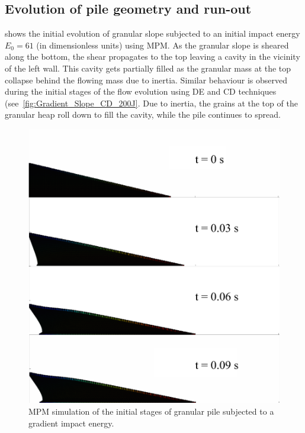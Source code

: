 \subsection{Evolution of pile geometry and run-out}
\label{sec:evolution}

 shows the initial evolution of granular 
slope subjected to an initial impact energy $E_0 = 61$ (in dimensionless units) 
using MPM. As the granular slope is sheared along the bottom, the shear 
propagates to the top leaving a cavity in the vicinity of the left wall. This 
cavity gets partially filled as the granular mass at the top collapse behind 
the flowing mass due to inertia. Similar behaviour is observed during the 
initial stages of the flow evolution using DE and CD techniques
(see~\cref{fig:Gradient_Slope_CD_200J}. Due to inertia, the grains at the top 
of the granular heap roll down to fill the cavity, while the pile continues to 
spread. 

\begin{figure}[tbph]
\centering
\includegraphics[width=\textwidth]{Gradient_Slope_Profile_200J}
\caption{MPM simulation of the initial stages of granular pile subjected to a 
gradient impact 
energy.}
\label{fig:Gradient_Slope_Profile_200J}
\end{figure}

